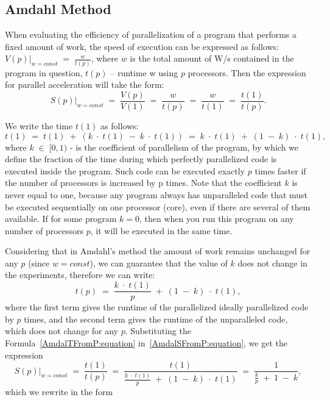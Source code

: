 { %
	\subsection{Amdahl Method}
	\par When evaluating the efficiency of parallelization of a program that performs a fixed amount of work, the speed of execution can be expressed as follows:$\left.V(p)\right|_{w=const}\;=\;\frac w{t(p)}$, where $w$  is the total amount of W/s contained in the program in question, $t(p)$ – runtime w using $ p $ processors. Then the expression for parallel acceleration will take the form:
	\begin{equation}
		\label{AmdalSFromP:equation}
		\left.S(p)\right|_{w=const}\;=\;\frac{V(p)}{V(1)}\;=\;\frac w{t(p)}\;=\;\frac w{t(1)}\;=\;\frac{t(1)}{t(p)}.
	\end{equation}
	\par We write the time $t(1)$ as follows:
	\begin{equation}
		t(1)\;=\;t(1)\;+\;(k\;\cdot\;t(1)\;-\;k\;\cdot\;t(1))\;=\;k\;\cdot\;t(1)\;+\;(1\;-\;k)\;\cdot\;t(1),
	\end{equation}
	where $k\;\in\;\lbrack0,1)$ - is the coefficient of parallelism of the program, by which we define the fraction of the time during which perfectly parallelized code is executed inside the program. Such code can be executed exactly $p$ times faster if the number of processors is increased by p times. Note that the coefficient $k$ is never equal to one, because any program always has unparalleled code that must be executed sequentially on one processor (core), even if there are several of them available. If for some program $k =0 $, then when you run this program on any number of processors $p$, it will be executed in the same time.
	\par Considering that in Amdahl’s method the amount of work remains unchanged for any $p$ (since $w = const$), we can guarantee that the value of $ k $ does not change in the experiments, therefore we can write:
	\begin{equation}
		\label{AmdalTFromP:equation}
		t(p)\;=\;\frac{k\;\cdot\;t(1)}p\;+\;(1\;-\;k)\;\cdot\;t(1),
	\end{equation}
where the first term gives the runtime of the parallelized ideally parallelized code by $p$ times, and the second term gives the runtime of the unparalleled code, which does not change for any $p$. Substituting the Formula~\eqref{AmdalTFromP:equation} in~\eqref{AmdalSFromP:equation}, we get the expression $$\left.S(p)\right|_{w=const}\;=\;\frac{t(1)}{t(p)}\;=\;\frac{t(1)}{{\displaystyle\frac{k\;\cdot\;t(1)}p}\;+\;(1\;-\;k)\;\cdot\;t(1)}\;=\;\frac1{{\displaystyle\frac kp}\;+\;1\;-\;k},$$ which we rewrite in the form
}
